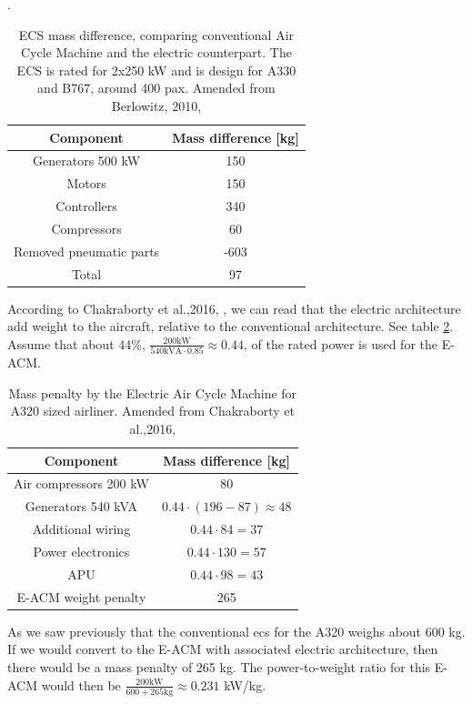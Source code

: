 \documentclass[english]{kththesis}
\begin{document}
\begin{table}[h!]
\centering
\caption{ECS mass difference, comparing conventional Air Cycle Machine and the electric counterpart. The ECS is rated for 2x250 kW and is design for A330 and B767, around 400 pax. Amended from Berlowitz, 2010, \cite{Berlowitz2010}}.
\begin{tabular}{| c | c |} 
\hline
Component & Mass difference [kg] \\
\hline
Generators 500 kW & 150 \\
Motors & 150 \\
Controllers & 340 \\
Compressors & 60 \\
Removed pneumatic parts & -603 \\
\hline
Total & 97 \\
\hline
\end{tabular}
\label{table:BerlowitzMass}
\end{table}

According to Chakraborty et al.,2016, \cite{Chakraborty2016}, we can read that the electric architecture add weight to the aircraft, relative to the conventional architecture. See table \ref{table:ChakrabortyMass}. Assume that about 44\%, $\frac{200 \text{kW}}{540 \text{kVA}\cdot 0.85}\approx 0.44$, of the rated power is used for the E-ACM.

\begin{table}[h!]
\caption{Mass penalty by the Electric Air Cycle Machine for A320 sized airliner. Amended from Chakraborty et al.,2016, \cite{Chakraborty2016}}
\centering
\begin{tabular}{| c | c |} 
 \hline
 Component & Mass difference [kg] \\
 \hline
 Air compressors 200 kW & 80\\ 
 Generators 540 kVA & $0.44\cdot(196-87)\approx48$\\
 Additional wiring & $0.44\cdot84=37$\\
 Power electronics & $0.44\cdot130=57$\\
 APU & $0.44\cdot98=43$\\ 
 \hline
 E-ACM weight penalty & 265\\
 \hline
\end{tabular}
\label{table:ChakrabortyMass}
\end{table}

As we saw previously that the conventional \acrshort{ecs} for the A320 weighs about 600 kg. If we would convert to the E-ACM with associated electric architecture, then there would be a mass penalty of 265 kg. The power-to-weight ratio for this E-ACM would then be $\frac{200 \text{kW}}{600+265 \text{kg}}\approx 0.231$ kW/kg.
\end{document}
